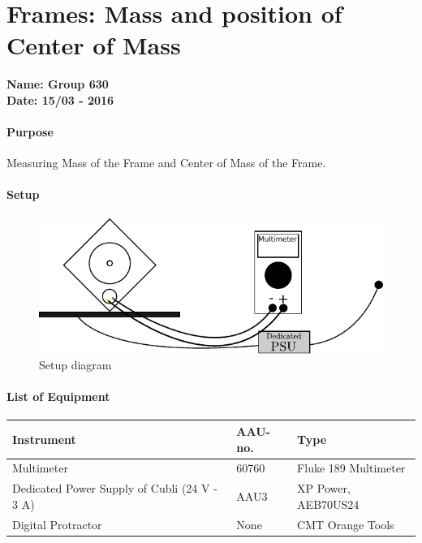 \chapter{Frames: Mass and position of Center of Mass }\label{app:MassFrameCenterOfMass} 
\textbf{Name: Group 630}\\
\textbf{Date: 15/03 - 2016}

\subsubsection{Purpose}
Measuring Mass of the Frame and Center of Mass of the Frame.

\subsubsection{Setup}
\begin{figure}[H]
	\centering
	\includegraphics[scale=1]{figures/LabSetupLinearityTest.pdf}
	\caption{Setup diagram}
	\label{LabSetupRangeTest}
\end{figure}\vspace{-5mm}

\subsubsection{List of Equipment}
\begin{table}[H]
	\begin{tabular}{|l|l|p{4.3cm}|}
		\hline%
		\textbf{Instrument}                                  &  \textbf{AAU-no.}  &  \textbf{Type}                       \\
		\hline%
		Multimeter                                           &  60760           &  Fluke 189 Multimeter		                   \\
		\hline%
		Dedicated Power Supply of Cubli \small{(24 V - 3 A)} &  AAU3                   &  XP Power, AEB70US24                 \\
		\hline%
		Digital Protractor                                   &  None               & CMT Orange Tools     \\
		\hline%
	\end{tabular}
\end{table}

